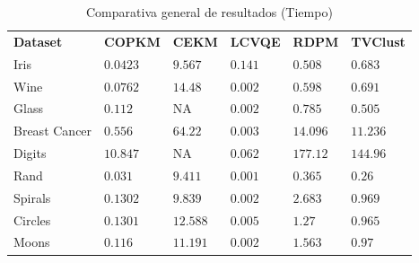 \begin{table}[!h]
	\centering
	\setlength{\arrayrulewidth}{1mm}
	\setlength{\tabcolsep}{9pt}
	\renewcommand{\arraystretch}{0.8}
	
	\begin{tabular}{ >{\centering\arraybackslash}m{2.5cm}  >{\centering\arraybackslash}m{1.2cm}>{\centering\arraybackslash}m{1.1cm}>{\centering\arraybackslash}m{1.1cm}>{\centering\arraybackslash}m{1.1cm}>{\centering\arraybackslash}m{1.3cm}}
		\hline
		\rowcolor{black}
		\multicolumn{6}{c}{\bf \color{white}{Comparativa General de Resultados (Tiempo)}}\\
		\hline
		\rowcolor{gray!50}
		\textbf{Dataset} & \textbf{COPKM} & \textbf{CEKM} & \textbf{LCVQE} & \textbf{RDPM} & \textbf{TVClust}  \\
		Iris & $0.0423 $  & $9.567 $ & $0.141 $ & $0.508 $ & $0.683 $ \\
		Wine & $0.0762 $  & $14.48 $ & $0.002 $ & $0.598 $ & $0.691 $ \\
		Glass & $0.112 $  & NA & $0.002 $ & $0.785 $ & $0.505 $ \\
		Breast Cancer & $0.556 $ & $64.22 $ & $0.003 $ & $14.096 $ & $11.236 $\\
		Digits & $10.847 $ & NA & $0.062 $ & $177.12 $ & $144.96 $ \\
		Rand & $0.031 $ & $9.411 $ & $0.001 $ & $0.365 $ & $0.26 $ \\
		Spirals & $0.1302 $ & $9.839 $ & $0.002 $ & $2.683 $ & $0.969 $ \\
		Circles & $0.1301 $ & $12.588 $ & $0.005  $ & $1.27 $ & $0.965 $ \\
		Moons & $0.116 $ & $11.191 $ & $0.002 $ & $1.563 $ & $0.97 $ \\
		\hline
		
	\end{tabular}
	\caption{Comparativa general de resultados (Tiempo)}
	\label{tab:tabla14}
\end{table}

